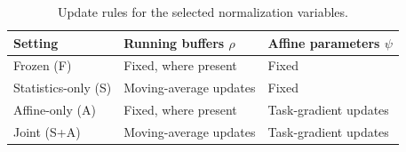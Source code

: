 \begin{table}[t]
	\caption{Update rules for the selected normalization variables.}
	\label{tab:recovery_modes}
	\centering
	\begin{tabular}{lll}
		\toprule
		Setting
		& Running buffers $\rho$
		& Affine parameters $\psi$ \\
		\midrule
		Frozen (F)
		& Fixed, where present
		& Fixed \\
		Statistics-only (S)
		& Moving-average updates
		& Fixed \\
		Affine-only (A)
		& Fixed, where present
		& Task-gradient updates \\
		Joint (S+A)
		& Moving-average updates
		& Task-gradient updates \\
		\bottomrule
	\end{tabular}
\end{table}
